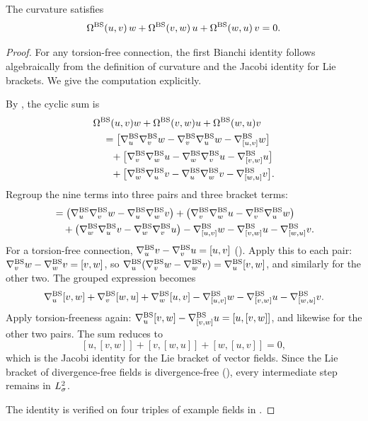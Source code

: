 \begin{proposition}\label{prop:bianchi}
  The curvature satisfies
  \begin{equation}\label{eq:bianchi}
    \Omega^{\mathrm{BS}}(u,v)\,w + \Omega^{\mathrm{BS}}(v,w)\,u + \Omega^{\mathrm{BS}}(w,u)\,v = 0.
  \end{equation}
\end{proposition}

\begin{proof}
  For any torsion-free connection, the first Bianchi identity follows
  algebraically from the definition of curvature and the Jacobi identity for
  Lie brackets.  We give the computation explicitly.

  By , the cyclic sum is
  \begin{align*}
    &\Omega^{\mathrm{BS}}(u,v)w + \Omega^{\mathrm{BS}}(v,w)u + \Omega^{\mathrm{BS}}(w,u)v \\
    &\quad= \bigl[\nabla^{\mathrm{BS}}_u\nabla^{\mathrm{BS}}_v w - \nabla^{\mathrm{BS}}_v\nabla^{\mathrm{BS}}_u w - \nabla^{\mathrm{BS}}_{[u,v]}w\bigr] \\
    &\quad\phantom{=}
      + \bigl[\nabla^{\mathrm{BS}}_v\nabla^{\mathrm{BS}}_w u - \nabla^{\mathrm{BS}}_w\nabla^{\mathrm{BS}}_v u - \nabla^{\mathrm{BS}}_{[v,w]}u\bigr] \\
    &\quad\phantom{=}
      + \bigl[\nabla^{\mathrm{BS}}_w\nabla^{\mathrm{BS}}_u v - \nabla^{\mathrm{BS}}_u\nabla^{\mathrm{BS}}_w v - \nabla^{\mathrm{BS}}_{[w,u]}v\bigr].
  \end{align*}
  Regroup the nine terms into three pairs and three bracket terms:
  \begin{align*}
    &= \bigl(\nabla^{\mathrm{BS}}_u\nabla^{\mathrm{BS}}_v w - \nabla^{\mathrm{BS}}_u\nabla^{\mathrm{BS}}_w v\bigr)
     + \bigl(\nabla^{\mathrm{BS}}_v\nabla^{\mathrm{BS}}_w u - \nabla^{\mathrm{BS}}_v\nabla^{\mathrm{BS}}_u w\bigr) \\
    &\quad + \bigl(\nabla^{\mathrm{BS}}_w\nabla^{\mathrm{BS}}_u v - \nabla^{\mathrm{BS}}_w\nabla^{\mathrm{BS}}_v u\bigr)
     - \nabla^{\mathrm{BS}}_{[u,v]}w - \nabla^{\mathrm{BS}}_{[v,w]}u - \nabla^{\mathrm{BS}}_{[w,u]}v.
  \end{align*}
  For a torsion-free connection, $\nabla^{\mathrm{BS}}_u v - \nabla^{\mathrm{BS}}_v u = [u,v]$
  ().  Apply this to each pair:
  $\nabla^{\mathrm{BS}}_v w - \nabla^{\mathrm{BS}}_w v = [v,w]$, so
  $\nabla^{\mathrm{BS}}_u(\nabla^{\mathrm{BS}}_v w - \nabla^{\mathrm{BS}}_w v) = \nabla^{\mathrm{BS}}_u[v,w]$, and similarly for the
  other two.  The grouped expression becomes
  \[
    \nabla^{\mathrm{BS}}_u[v,w] + \nabla^{\mathrm{BS}}_v[w,u] + \nabla^{\mathrm{BS}}_w[u,v]
    - \nabla^{\mathrm{BS}}_{[u,v]}w - \nabla^{\mathrm{BS}}_{[v,w]}u - \nabla^{\mathrm{BS}}_{[w,u]}v.
  \]
  Apply torsion-freeness again: $\nabla^{\mathrm{BS}}_u[v,w] - \nabla^{\mathrm{BS}}_{[v,w]}u = [u,[v,w]]$,
  and likewise for the other two pairs.  The sum reduces to
  \[
    [u,[v,w]] + [v,[w,u]] + [w,[u,v]] = 0,
  \]
  which is the Jacobi identity for the Lie bracket of vector fields.  Since
  the Lie bracket of divergence-free fields is divergence-free
  (), every intermediate step remains in $L^{2}_\sigma$.

  The identity is verified on four triples of example fields in .
\end{proof}


